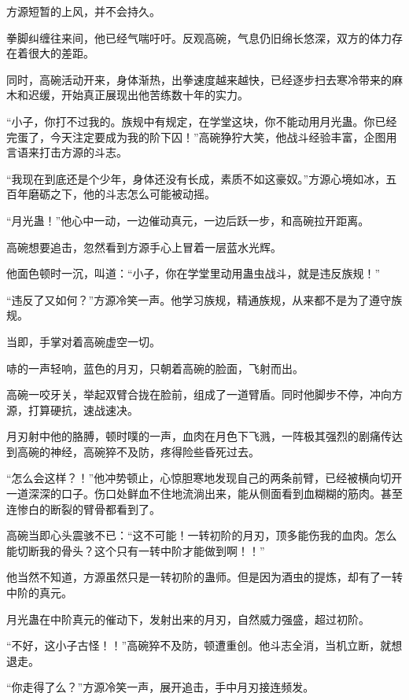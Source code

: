 
\begin{this_body}

方源短暂的上风，并不会持久。

拳脚纠缠往来间，他已经气喘吁吁。反观高碗，气息仍旧绵长悠深，双方的体力存在着很大的差距。

同时，高碗活动开来，身体渐热，出拳速度越来越快，已经逐步扫去寒冷带来的麻木和迟缓，开始真正展现出他苦练数十年的实力。

“小子，你打不过我的。族规中有规定，在学堂这块，你不能动用月光蛊。你已经完蛋了，今天注定要成为我的阶下囚！”高碗狰狞大笑，他战斗经验丰富，企图用言语来打击方源的斗志。

“我现在到底还是个少年，身体还没有长成，素质不如这豪奴。”方源心境如冰，五百年磨砺之下，他的斗志怎么可能被动摇。

“月光蛊！”他心中一动，一边催动真元，一边后跃一步，和高碗拉开距离。

高碗想要追击，忽然看到方源手心上冒着一层蓝水光辉。

他面色顿时一沉，叫道：“小子，你在学堂里动用蛊虫战斗，就是违反族规！”

“违反了又如何？”方源冷笑一声。他学习族规，精通族规，从来都不是为了遵守族规。

当即，手掌对着高碗虚空一切。

哧的一声轻响，蓝色的月刃，只朝着高碗的脸面，飞射而出。

高碗一咬牙关，举起双臂合拢在脸前，组成了一道臂盾。同时他脚步不停，冲向方源，打算硬抗，速战速决。

月刃射中他的胳膊，顿时噗的一声，血肉在月色下飞溅，一阵极其强烈的剧痛传达到高碗的神经，高碗猝不及防，疼得险些昏死过去。

“怎么会这样？！”他冲势顿止，心惊胆寒地发现自己的两条前臂，已经被横向切开一道深深的口子。伤口处鲜血不住地流淌出来，能从侧面看到血糊糊的筋肉。甚至连惨白的断裂的臂骨都看到了。

高碗当即心头震骇不已：“这不可能！一转初阶的月刃，顶多能伤我的血肉。怎么能切断我的骨头？这个只有一转中阶才能做到啊！！”

他当然不知道，方源虽然只是一转初阶的蛊师。但是因为酒虫的提炼，却有了一转中阶的真元。

月光蛊在中阶真元的催动下，发射出来的月刃，自然威力强盛，超过初阶。

“不好，这小子古怪！！”高碗猝不及防，顿遭重创。他斗志全消，当机立断，就想退走。

“你走得了么？”方源冷笑一声，展开追击，手中月刃接连频发。


\end{this_body}
